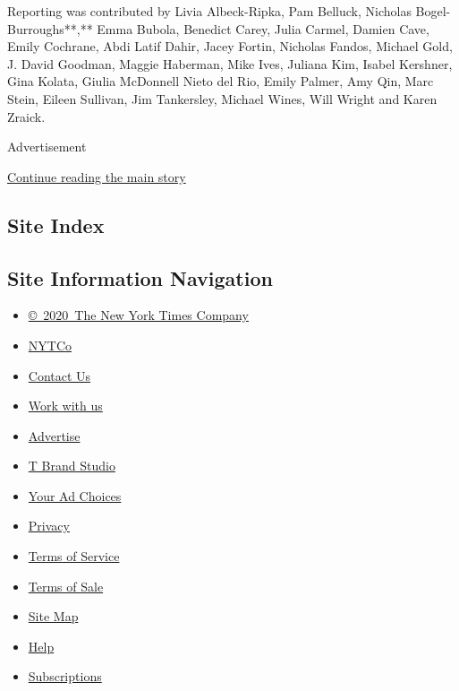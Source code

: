 Reporting was contributed by Livia Albeck-Ripka, Pam Belluck, Nicholas
Bogel-Burroughs**,** Emma Bubola, Benedict Carey, Julia Carmel, Damien
Cave, Emily Cochrane, Abdi Latif Dahir, Jacey Fortin, Nicholas Fandos,
Michael Gold, J. David Goodman, Maggie Haberman, Mike Ives, Juliana Kim,
Isabel Kershner, Gina Kolata, Giulia McDonnell Nieto del Rio, Emily
Palmer, Amy Qin, Marc Stein, Eileen Sullivan, Jim Tankersley, Michael
Wines, Will Wright and Karen Zraick.

Advertisement

\protect\hyperlink{after-bottom}{Continue reading the main story}

\hypertarget{site-index}{%
\subsection{Site Index}\label{site-index}}

\hypertarget{site-information-navigation}{%
\subsection{Site Information
Navigation}\label{site-information-navigation}}

\begin{itemize}
\tightlist
\item
  \href{https://help.nytimes.com/hc/en-us/articles/115014792127-Copyright-notice}{©~2020~The
  New York Times Company}
\end{itemize}

\begin{itemize}
\tightlist
\item
  \href{https://www.nytco.com/}{NYTCo}
\item
  \href{https://help.nytimes.com/hc/en-us/articles/115015385887-Contact-Us}{Contact
  Us}
\item
  \href{https://www.nytco.com/careers/}{Work with us}
\item
  \href{https://nytmediakit.com/}{Advertise}
\item
  \href{http://www.tbrandstudio.com/}{T Brand Studio}
\item
  \href{https://www.nytimes.com/privacy/cookie-policy\#how-do-i-manage-trackers}{Your
  Ad Choices}
\item
  \href{https://www.nytimes.com/privacy}{Privacy}
\item
  \href{https://help.nytimes.com/hc/en-us/articles/115014893428-Terms-of-service}{Terms
  of Service}
\item
  \href{https://help.nytimes.com/hc/en-us/articles/115014893968-Terms-of-sale}{Terms
  of Sale}
\item
  \href{https://spiderbites.nytimes.com}{Site Map}
\item
  \href{https://help.nytimes.com/hc/en-us}{Help}
\item
  \href{https://www.nytimes.com/subscription?campaignId=37WXW}{Subscriptions}
\end{itemize}
